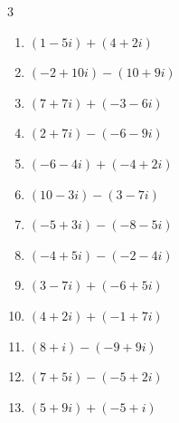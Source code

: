\begin{multicols}{3}
\begin{enumerate}
        \phantom{$\displaystyle =-4+12i$}

  \item $\displaystyle (1-5i) + (4+2i)$

        \phantom{$\displaystyle =5-3i$}

  \item $\displaystyle (-2+10i) - (10+9i)$

        \phantom{$\displaystyle =-12+i$}

  \item $\displaystyle (7+7i) + (-3-6i)$

        \phantom{$\displaystyle =4+i$}

  \item $\displaystyle (2+7i) - (-6-9i)$

        \phantom{$\displaystyle =8+16i$}

  \item $\displaystyle (-6-4i) + (-4+2i)$

        \phantom{$\displaystyle =-10-2i$}

  \item $\displaystyle (10-3i) - (3-7i)$

        \phantom{$\displaystyle =7+4i$}

  \item $\displaystyle (-5+3i) - (-8-5i)$

        \phantom{$\displaystyle =3+8i$}

  \item $\displaystyle (-4+5i) - (-2-4i)$

        \phantom{$\displaystyle =-2+9i$}

  \item $\displaystyle (3-7i) + (-6+5i)$

        \phantom{$\displaystyle =-3-2i$}

  \item $\displaystyle (4+2i) + (-1+7i)$

        \phantom{$\displaystyle =3+9i$}

  \item $\displaystyle (8+i) - (-9+9i)$

        \phantom{$\displaystyle =17-8i$}

  \item $\displaystyle (7+5i) - (-5+2i)$

        \phantom{$\displaystyle =12+3i$}

  \item $\displaystyle (5+9i) + (-5+i)$


\end{enumerate}
\end{multicols}
